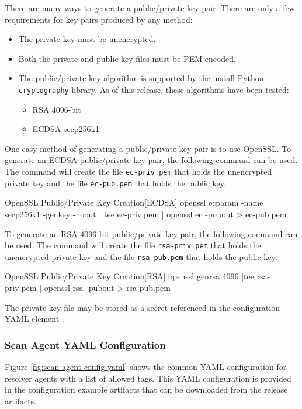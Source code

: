 There are many ways to generate a public/private key pair.  There are only a few requirements
for key pairs produced by any method:

\begin{itemize}
  \item The private key must be unencrypted.
  \item Both the private and public key files must be PEM encoded.
  \item The public/private key algorithm is supported by the install Python \texttt{cryptography} library.
    As of this release, these algorithms have been tested:
  \begin{itemize}
      \item RSA 4096-bit
      \item ECDSA secp256k1
  \end{itemize}
\end{itemize}

One easy method of generating a public/private key pair is to use OpenSSL.  To generate an ECDSA public/private key pair,
the following command can be used.  The command will create the file \texttt{ec-priv.pem} that holds the unencrypted private key
and the file \texttt{ec-pub.pem} that holds the public key.

\begin{code}{OpenSSL Public/Private Key Creation}{[ECDSA]}{}
openssl ecparam -name secp256k1 -genkey -noout | tee ec-priv.pem | openssl ec -pubout > ec-pub.pem  
\end{code}

To generate an RSA 4096-bit public/private key pair,
the following command can be used.  The command will create the file \texttt{rsa-priv.pem} that holds the unencrypted private key
and the file \texttt{rsa-pub.pem} that holds the public key.

\begin{code}{OpenSSL Public/Private Key Creation}{[RSA]}{}
openssl genrsa 4096 |tee rsa-priv.pem | openssl rsa -pubout > rsa-pub.pem
\end{code}

The private key file may be stored as a secret referenced in the configuration YAML element .

\subsubsection{Scan Agent YAML Configuration}\label{sec:scan-agent-yaml-config}
Figure \ref{fig:scan-agent-config-yaml} shows the common YAML configuration for resolver agents with a list of allowed tags.
This YAML configuration is provided in the configuration example artifacts that can be downloaded from the \cxoneflow release
artifacts.

